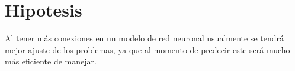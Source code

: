 \section{Hipotesis}
    Al tener m\'as conexiones en un modelo de red neuronal usualmente se tendr\'a mejor ajuste de los 
    problemas, ya que al momento de predecir este ser\'a mucho m\'as eficiente de manejar.